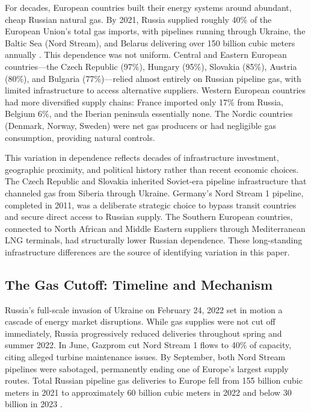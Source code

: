 \documentclass[12pt]{article}
\begin{document}
For decades, European countries built their energy systems around abundant, cheap Russian natural gas. By 2021, Russia supplied roughly 40\% of the European Union's total gas imports, with pipelines running through Ukraine, the Baltic Sea (Nord Stream), and Belarus delivering over 150 billion cubic meters annually \citep{stern2022, iea2022}. This dependence was not uniform. Central and Eastern European countries---the Czech Republic (97\%), Hungary (95\%), Slovakia (85\%), Austria (80\%), and Bulgaria (77\%)---relied almost entirely on Russian pipeline gas, with limited infrastructure to access alternative suppliers. Western European countries had more diversified supply chains: France imported only 17\% from Russia, Belgium 6\%, and the Iberian peninsula essentially none. The Nordic countries (Denmark, Norway, Sweden) were net gas producers or had negligible gas consumption, providing natural controls.

This variation in dependence reflects decades of infrastructure investment, geographic proximity, and political history rather than recent economic choices. The Czech Republic and Slovakia inherited Soviet-era pipeline infrastructure that channeled gas from Siberia through Ukraine. Germany's Nord Stream 1 pipeline, completed in 2011, was a deliberate strategic choice to bypass transit countries and secure direct access to Russian supply. The Southern European countries, connected to North African and Middle Eastern suppliers through Mediterranean LNG terminals, had structurally lower Russian dependence. These long-standing infrastructure differences are the source of identifying variation in this paper.

\subsection{The Gas Cutoff: Timeline and Mechanism}

Russia's full-scale invasion of Ukraine on February 24, 2022 set in motion a cascade of energy market disruptions. While gas supplies were not cut off immediately, Russia progressively reduced deliveries throughout spring and summer 2022. In June, Gazprom cut Nord Stream 1 flows to 40\% of capacity, citing alleged turbine maintenance issues. By September, both Nord Stream pipelines were sabotaged, permanently ending one of Europe's largest supply routes. Total Russian pipeline gas deliveries to Europe fell from 155 billion cubic meters in 2021 to approximately 60 billion cubic meters in 2022 and below 30 billion in 2023 \citep{neumann2023}.
\end{document}
